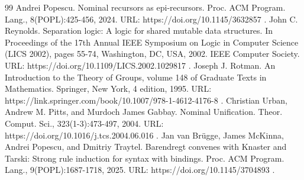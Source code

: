\documentclass[10pt,a4paper]{amsart}
\begin{document}
\begin{thebibliography}{99}
 Andrei Popescu. Nominal recursors as epi-recursors. Proc. ACM Program. Lang., 8(POPL):425-456, 2024. URL: https://doi.org/10.1145/3632857 .
 John C. Reynolds. Separation logic: A logic for shared mutable data structures. In Proceedings of the 17th Annual IEEE Symposium on Logic in Computer Science (LICS 2002), pages 55-74, Washington, DC, USA, 2002. IEEE Computer Society. URL: https://doi.org/10.1109/LICS.2002.1029817 .
 Joseph J. Rotman. An Introduction to the Theory of Groups, volume 148 of Graduate Texts in Mathematics. Springer, New York, 4 edition, 1995. URL: https://link.springer.com/book/10.1007/978-1-4612-4176-8 .
 Christian Urban, Andrew M. Pitts, and Murdoch James Gabbay. Nominal Unification. Theor. Comput. Sci., 323(1-3):473-497, 2004. URL: https://doi.org/10.1016/j.tcs.2004.06.016 .
 Jan van Brügge, James McKinna, Andrei Popescu, and Dmitriy Traytel. Barendregt convenes with Knaster and Tarski: Strong rule induction for syntax with bindings. Proc. ACM Program. Lang., 9(POPL):1687-1718, 2025. URL: https://doi.org/10.1145/3704893 .
\end{thebibliography}
\end{document}
